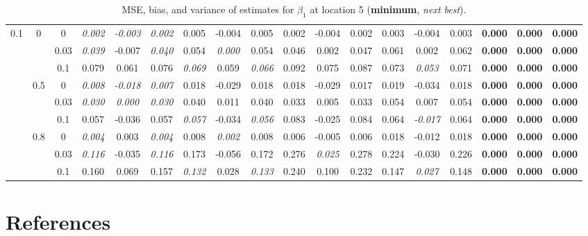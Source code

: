 \documentclass[authoryear, review, 10pt]{elsarticle}
\begin{document}
\begin{sidewaystable}[ht]
\begin{center}
\begin{tabular}{ccc|ccc|ccc|ccc|ccc|ccc}
\multirow{9}{*}{0.1} & \multirow{3}{*}{0} & 0 &   \emph{0.002} & \emph{-0.003} & \emph{0.002} & 0.005 & -0.004 & 0.005 & 0.002 & -0.004 & 0.002 & 0.003 & -0.004 & 0.003 & \textbf{0.000} & \textbf{0.000} & \textbf{0.000} \\ 
 &  & 0.03 &   \emph{0.039} & -0.007 & \emph{0.040} & 0.054 & \emph{0.000} & 0.054 & 0.046 & 0.002 & 0.047 & 0.061 & 0.002 & 0.062 & \textbf{0.000} & \textbf{0.000} & \textbf{0.000} \\ 
 &  & 0.1 &   0.079 & 0.061 & 0.076 & \emph{0.069} & 0.059 & \emph{0.066} & 0.092 & 0.075 & 0.087 & 0.073 & \emph{0.053} & 0.071 & \textbf{0.000} & \textbf{0.000} & \textbf{0.000} \\ \cline{2-18}
 & \multirow{3}{*}{0.5} & 0 &   \emph{0.008} & \emph{-0.018} & \emph{0.007} & 0.018 & -0.029 & 0.018 & 0.018 & -0.029 & 0.017 & 0.019 & -0.034 & 0.018 & \textbf{0.000} & \textbf{0.000} & \textbf{0.000} \\ 
 &  & 0.03 &   \emph{0.030} & \emph{0.000} & \emph{0.030} & 0.040 & 0.011 & 0.040 & 0.033 & 0.005 & 0.033 & 0.054 & 0.007 & 0.054 & \textbf{0.000} & \textbf{0.000} & \textbf{0.000} \\ 
 &  & 0.1 &   0.057 & -0.036 & 0.057 & \emph{0.057} & -0.034 & \emph{0.056} & 0.083 & -0.025 & 0.084 & 0.064 & \emph{-0.017} & 0.064 & \textbf{0.000} & \textbf{0.000} & \textbf{0.000} \\ \cline{2-18}
 & \multirow{3}{*}{0.8} & 0 &   \emph{0.004} & 0.003 & \emph{0.004} & 0.008 & \emph{0.002} & 0.008 & 0.006 & -0.005 & 0.006 & 0.018 & -0.012 & 0.018 & \textbf{0.000} & \textbf{0.000} & \textbf{0.000} \\ 
 &  & 0.03 &   \emph{0.116} & -0.035 & \emph{0.116} & 0.173 & -0.056 & 0.172 & 0.276 & \emph{0.025} & 0.278 & 0.224 & -0.030 & 0.226 & \textbf{0.000} & \textbf{0.000} & \textbf{0.000} \\ 
 &  & 0.1 &   0.160 & 0.069 & 0.157 & \emph{0.132} & 0.028 & \emph{0.133} & 0.240 & 0.100 & 0.232 & 0.147 & \emph{0.027} & 0.148 & \textbf{0.000} & \textbf{0.000} & \textbf{0.000} \\ 
  \end{tabular}
\caption{MSE, bias, and variance of estimates for $\beta_1$ at location 5 (\textbf{minimum}, \emph{next best}).}
\end{center}
\end{sidewaystable}



\section{References}


\end{document}
